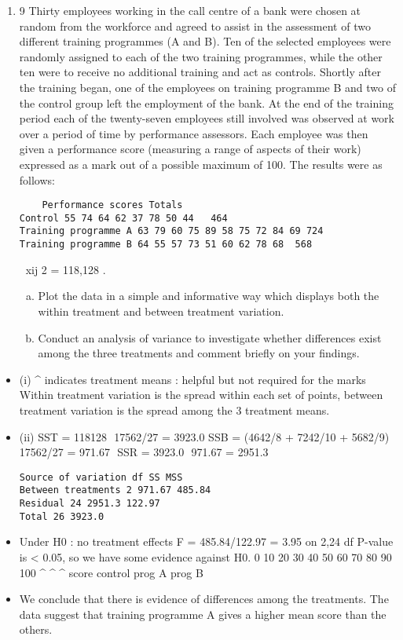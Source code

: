 \documentclass[a4paper,12pt]{article}
\begin{document}
\begin{enumerate}
\item 9 Thirty employees working in the call centre of a bank were chosen at random from
the workforce and agreed to assist in the assessment of two different training
programmes (A and B).
Ten of the selected employees were randomly assigned to each of the two training
programmes, while the other ten were to receive no additional training and act as
controls.
Shortly after the training began, one of the employees on training programme B and
two of the control group left the employment of the bank.
At the end of the training period each of the twenty-seven employees still involved
was observed at work over a period of time by performance assessors. Each
employee was then given a performance score (measuring a range of aspects of their
work) expressed as a mark out of a possible maximum of 100.
The results were as follows:
\begin{verbatim}
    Performance scores Totals
Control 55 74 64 62 37 78 50 44   464
Training programme A 63 79 60 75 89 58 75 72 84 69 724
Training programme B 64 55 57 73 51 60 62 78 68  568

\end{verbatim}
xij
2 = 118,128 .
\begin{enumerate}[(a)]
\item Plot the data in a simple and informative way which displays both the within
treatment and between treatment variation. 
\item  Conduct an analysis of variance to investigate whether differences exist
among the three treatments and comment briefly on your findings. 
\end{enumerate}


\end{enumerate}

\newpage
\begin{itemize}
\item (i)
^ indicates treatment means : helpful but not required for the marks
Within treatment variation is the spread within each set of points, between
treatment variation is the spread among the 3 treatment means.
\item (ii) SST = 118128  17562/27 = 3923.0
SSB = (4642/8 + 7242/10 + 5682/9)  17562/27 = 971.67
 SSR = 3923.0  971.67 = 2951.3
\begin{verbatim}
Source of variation df SS MSS
Between treatments 2 971.67 485.84
Residual 24 2951.3 122.97
Total 26 3923.0
\end{verbatim}

\item Under H0 : no treatment effects F = 485.84/122.97 = 3.95 on 2,24 df
P-value is < 0.05, so we have some evidence against H0.
0 10 20 30 40 50 60 70 80 90 100
^
^
^
score
control
prog A
prog B
\item We conclude that there is evidence of differences among the treatments. The
data suggest that training programme A gives a higher mean score than the
others.
\end{itemize}
\end{document}
